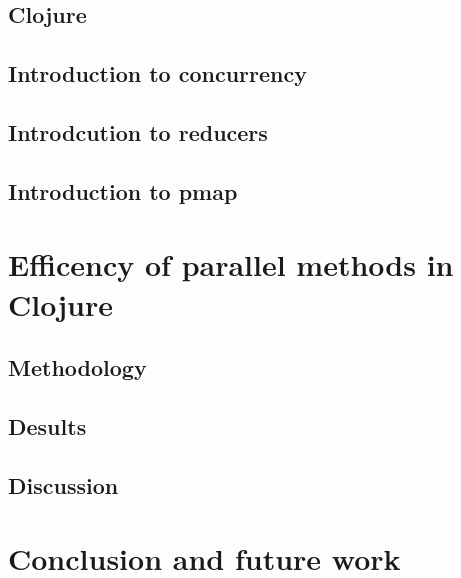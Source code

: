 \documentclass[12pt]{article}
\begin{document}
\subsection{Clojure}\label{sec:clojure}

\subsection{Introduction to concurrency}\label{sec:concurrency}

\subsection{Introdcution to reducers}\label{sec:reducers}

\subsection{Introduction to pmap}\label{sec:pmap}

\section{Efficency of parallel methods in Clojure}\label{sec:efficency}

\subsection{Methodology}\label{sec:methods}

\subsection{Desults}\label{sec:results}

\subsection{Discussion}\label{sec:discussion}

\section{Conclusion and future work}\label{sec:conclusion}

%
%

%  
%
%




\end{document}
